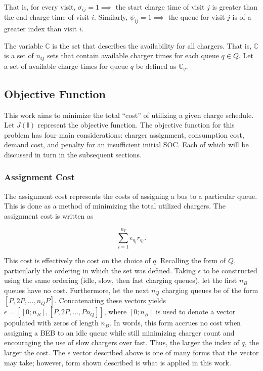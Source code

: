 \documentclass[ee,thesis]{usuthesis}
\newcommand{\I}{\mathbb{I}}                 %
\newcommand{\C}{\mathbb{C}}                 %
\begin{document}
That is, for every visit, \(\sigma_{ij} = 1 \implies\) the start charge time of visit \(j\) is greater than the end charge time
of visit \(i\). Similarly, \(\psi_{ij} = 1 \implies\) the queue for visit \(j\) is of a greater index than visit \(i\).

The variable \(\C\) is the set that describes the availability for all chargers. That is, \(\C\) is a set of \(n_Q\) sets that
contain available charger times for each queue \(q \in Q\). Let a set of available charge times for queue \(q\) be defined as
\(\C_q\).

\subsection{Objective Function}
\label{sec:objective-function}
This work aims to minimize the total ``cost'' of utilizing a given charge schedule. Let \(J(\I)\) represent the objective
function. The objective function for this problem has four main considerations: charger assignment, consumption cost,
demand cost, and penalty for an insufficient initial SOC. Each of which will be discussed in turn in the subsequent
sections.

\subsubsection{Assignment Cost}
\label{sec:assignment-cost}
The assignment cost represents the costs of assigning a bus to a particular queue. This is done as a method of
minimizing the total utilized chargers. The assignment cost is written as

\begin{equation}
\label{eq:assignment-cost}
\sum_{i=1}^{n_V} \epsilon_{q_i}r_{q_i}\text{.}
\end{equation}

This cost is effectively the cost on the choice of \(q\). Recalling the form of \(Q\), particularly the ordering in which
the set was defined. Taking \(\epsilon\) to be constructed using the same ordering (idle, slow, then fast charging queues), let
the first \(n_B\) queues have no cost. Furthermore, let the next \(n_Q\) charging queues be of the form \([P, 2P, ...,
n_QP]\). Concatenating these vectors yields \(\epsilon = [[0; n_B], [P, 2P, ..., Pn_Q]]\), where \([0; n_B]\) is used to denote a
vector populated with zeros of length \(n_B\). In words, this form accrues no cost when assigning a BEB to an idle queue
while still minimizing charger count and encouraging the use of slow chargers over fast. Thus, the larger the index of
\(q\), the larger the cost. The \(\epsilon\) vector described above is one of many forms that the vector may take; however, form
shown described is what is applied in this work.
\end{document}
